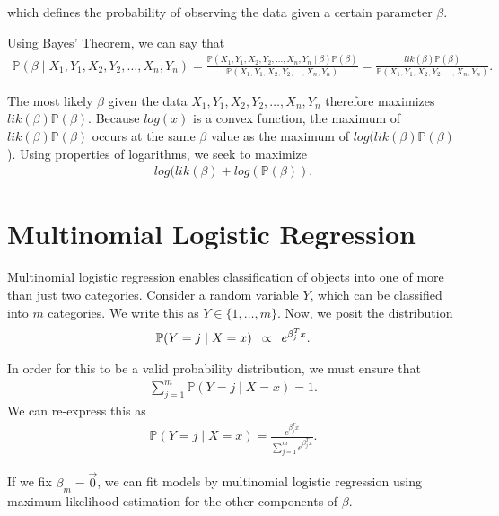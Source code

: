 \documentclass[a4paper]{article}
\begin{document}
which defines the probability of observing the data given a certain parameter $\beta$. 

Using Bayes' Theorem, we can say that 
\begin{align*}
\mathbb{P}(\beta\mid X_1,Y_1,X_2,Y_2,\ldots,X_n,Y_n)=\frac{\mathbb{P}(X_1,Y_1,X_2,Y_2,\ldots,X_n,Y_n\mid\beta)\mathbb{P}(\beta)}{\mathbb{P}(X_1,Y_1,X_2,Y_2,\ldots,X_n,Y_n)}=\frac{lik(\beta)\mathbb{P}(\beta)}{\mathbb{P}(X_1,Y_1,X_2,Y_2,\ldots,X_n,Y_n)}.
\end{align*}

The most likely $\beta$ given the data $X_1,Y_1,X_2,Y_2,\ldots,X_n,Y_n$ therefore maximizes $lik(\beta)\mathbb{P}(\beta)$. Because $log(x)$ is a convex function, the maximum of $lik(\beta)\mathbb{P}(\beta)$ occurs at the same $\beta$ value as the maximum of $log(lik(\beta)\mathbb{P}(\beta)$). Using properties of logarithms, we seek to maximize 
\begin{align*}
log(lik(\beta)+log(\mathbb{P}(\beta)).
\end{align*}
\section{Multinomial Logistic Regression}
Multinomial logistic regression enables classification of objects into one of more than just two categories. Consider a random variable $Y$, which can be classified into $m$ categories. We write this as $Y\in \{1,\ldots,m\}$. Now, we posit the distribution 
\begin{align*}
\mathbb{P}(Y=j \mid X=x)\hskip 5pt \propto\hskip 5pt e^{\beta^T_jx}. 
\end{align*}

In order for this to be a valid probability distribution, we must ensure that
\begin{align*}
\sum_{j=1}^{m} \mathbb{P}(Y=j \mid X=x)=1.
\end{align*}
We can re-express this as 
\begin{align*}
\mathbb{P}(Y=j \mid  X=x)=\frac{e^{\beta^T_jx}}{\sum_{j=1}^{m}e^{\beta^T_jx}}. 
\end{align*}

If we fix $\beta_m=\vec{0}$, we can fit models by multinomial logistic regression using maximum likelihood estimation for the other components of $\beta$. 

\title{}
\end{document}
